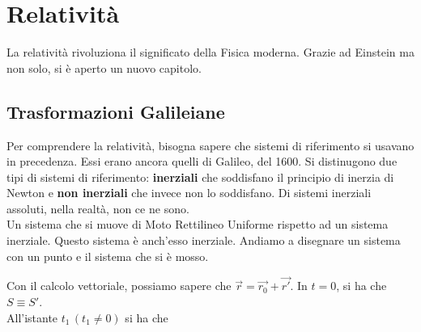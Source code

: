 
\section{Relatività}
La relatività rivoluziona il significato della Fisica moderna. Grazie ad Einstein ma non solo, si è
aperto un nuovo capitolo.

\subsection{Trasformazioni Galileiane}
Per comprendere la relatività, bisogna sapere che sistemi di riferimento si usavano in precedenza.
Essi erano ancora quelli di Galileo, del 1600. Si distinugono due tipi di sistemi di riferimento:
\textbf{inerziali} che soddisfano il principio di inerzia di Newton e \textbf{non inerziali} che
invece non lo soddisfano. Di sistemi inerziali assoluti, nella realtà, non ce ne sono.\\
Un sistema che si muove di Moto Rettilineo Uniforme rispetto ad un sistema inerziale. Questo sistema
è anch'esso inerziale. Andiamo a disegnare un sistema con un punto e il sistema che si è mosso.
\begin{center}
\end{center}
Con il calcolo vettoriale, possiamo sapere che $\vec{r} = \vec{r_0}+\vec{r'}$. In $t=0$, si ha che
$S \equiv S'$.\\
All'istante $t_1\,(t_1\neq0)$ si ha che
